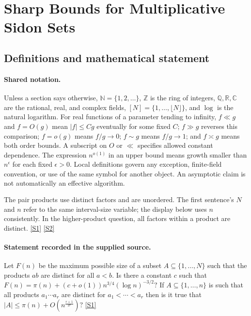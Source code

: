 \documentclass[11pt,a4paper]{article}
\newcommand{\N}{\mathbb{N}}
\newcommand{\Z}{\mathbb{Z}}
\newcommand{\Q}{\mathbb{Q}}
\newcommand{\R}{\mathbb{R}}
\newcommand{\C}{\mathbb{C}}
\newcommand{\sref}[2]{\hyperlink{source:#1:#2}{[S#2]}}
\begin{document}
\section{Sharp Bounds for Multiplicative Sidon Sets}\label{statement}


\subsection{Definitions and mathematical statement}

\paragraph{Shared notation.}Unless a section says otherwise, $\N=\{1,2,\ldots\}$,
$\Z$ is the ring of integers, $\Q,\R,\C$ are the rational, real, and complex
fields, $[N]=\{1,\ldots,\lfloor N\rfloor\}$, and $\log$ is the natural
logarithm. For real functions of a parameter tending to infinity,
$f\ll g$ and $f=O(g)$ mean $|f|\leq Cg$ eventually for some fixed $C$;
$f\gg g$ reverses this comparison; $f=o(g)$ means $f/g\to0$;
$f\sim g$ means $f/g\to1$; and $f\asymp g$ means both order bounds.
A subscript on $O$ or $\ll$ specifies allowed constant dependence.
The expression $n^{o(1)}$ in an upper bound means growth smaller than
$n^\epsilon$ for each fixed $\epsilon>0$. Local definitions govern any
exception, finite-field convention, or use of the same symbol for another
object. An asymptotic claim is not automatically an effective algorithm.



The pair products use distinct factors and are unordered. The first sentence's $N$ and $n$ refer to the same interval-size variable; the display below uses $n$ consistently. In the higher-product question, all factors within a product are distinct. \sref{statement}{1} \sref{statement}{2}

\paragraph{Statement recorded in the supplied source.}
Let $F(n)$ be the maximum possible size of a subset $A\subseteq\{1,\ldots,N\}$ such that the products $ab$ are distinct for all $a<b$. Is there a constant $c$ such that $ F(n)=\pi(n)+(c+o(1))n^{3/4}(\log n)^{-3/2}? $ If $A\subseteq \{1,\ldots,n\}$ is such that all products $a_1\cdots a_r$ are distinct for $a_1<\cdots <a_r$ then is it true that $ \lvert A\rvert \leq \pi(n)+O(n^{\frac{r+1}{2r}})? $ \sref{statement}{1}
\end{document}
